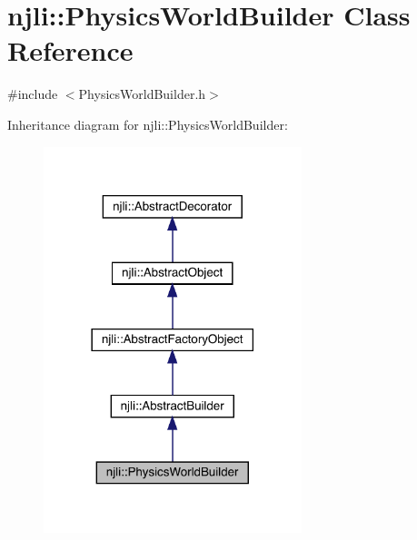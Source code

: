 \hypertarget{classnjli_1_1_physics_world_builder}{}\section{njli\+:\+:Physics\+World\+Builder Class Reference}
\label{classnjli_1_1_physics_world_builder}


{\ttfamily \#include $<$Physics\+World\+Builder.\+h$>$}



Inheritance diagram for njli\+:\+:Physics\+World\+Builder\+:\nopagebreak
\begin{figure}[H]
\begin{center}
\leavevmode
\includegraphics[width=213pt]{classnjli_1_1_physics_world_builder__inherit__graph}
\end{center}
\end{figure}


